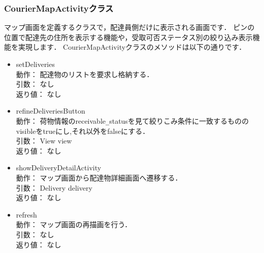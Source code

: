 \documentclass[a4j,titlepage]{jarticle}
\begin{document}
\subsubsection{CourierMapActivityクラス}
マップ画面を定義するクラスで，配達員側だけに表示される画面です．
ピンの位置で配達先の住所を表示する機能や，受取可否ステータス別の絞り込み表示機能を実現します．
CourierMapActivityクラスのメソッドは以下の通りです．
\begin{itemize}
\item setDeliveries\\
  動作： 配達物のリストを要求し格納する．\\
引数： なし\\
返り値： なし

\item refineDeliveriesButton\\
動作： 荷物情報のreceivable\verb|_|statusを見て絞りこみ条件に一致するもののvisibleをtrueにし,それ以外をfalseにする．\\
引数： View view\\
返り値： なし

\item showDeliveryDetailActivity\\
動作： マップ画面から配達物詳細画面へ遷移する．\\
引数： Delivery delivery\\
返り値： なし

\item refresh\\
動作： マップ画面の再描画を行う．\\
引数： なし\\
返り値： なし
\end{itemize}
\end{document}
